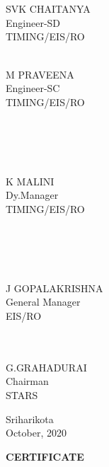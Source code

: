 \documentclass[a4paper, 12pt, oneside]{Thesis}  %
\begin{document}
	
	
	\noindent 
	
	
	
	
	\vspace*{1in}
	
	\parbox{1.8in}
	{
		 \\
		\noindent {\bf } \\
		\noindent             SVK CHAITANYA \\ 
		\noindent Engineer-SD\\
		\noindent TIMING/EIS/RO\\
	} 
	\hspace*{0.20in} 
	\parbox{1.5in}
	{
		\noindent {\bf} \\
		
		\noindent             M PRAVEENA\\ 
		\noindent Engineer-SC\\
		\noindent TIMING/EIS/RO\\
		
		
	}  
	
	
	\vspace*{0.25in}
	
	\parbox{2.2in}
	{
		\noindent {\bf} \\ \\
		 \\
		\noindent {\bf} \\
		\noindent             K MALINI \\ 
		\noindent Dy.Manager\\
		\noindent TIMING/EIS/RO\\
		\noindent {\bf} \\
		\noindent {\bf} \\
	} 
	\parbox{2.2in}
	{
	\noindent {\bf } \\
	\noindent {\bf } \\
	\noindent J GOPALAKRISHNA \\ 
	\noindent General Manager\\
	\noindent EIS/RO\\
	} 
\hspace*{0.20in} 
	
	\vspace*{0.25in}
	
	\parbox{2.2in}
	{
		 \\
		\noindent {\bf} \\
		\noindent             G.GRAHADURAI \\ 
		\noindent Chairman\\
		\noindent STARS\\
	} 
	\newline
	\hspace*{2.5in}
	\noindent Sriharikota\\
	\hspace*{2.4in}
	October, 2020
	\clearpage
	\vspace*{36pt}
	\begin{center}
		{\large \bf CERTIFICATE}
	\end{center}
	
\end{document}
